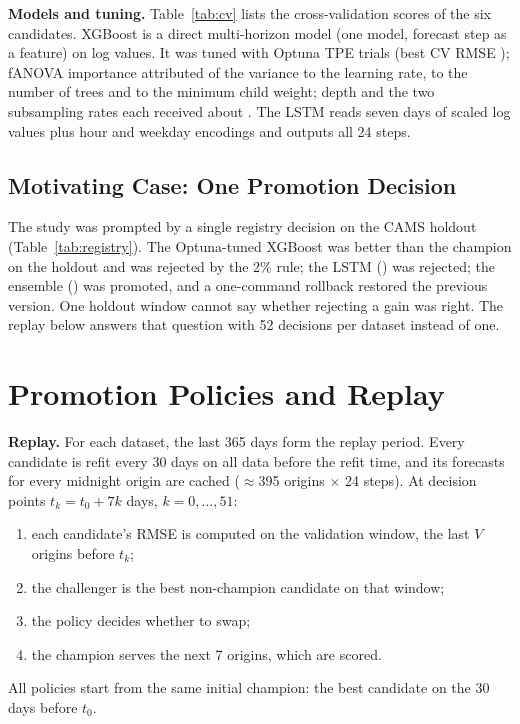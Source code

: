 \documentclass[conference]{IEEEtran}
\begin{document}
\textbf{Models and tuning.} Table~\ref{tab:cv} lists the cross-validation scores of the six
candidates. XGBoost is a direct multi-horizon model (one model, forecast step as a feature) on
log values. It was tuned with  Optuna TPE trials (best CV RMSE );
fANOVA importance attributed  of the variance to the learning rate,
 to the number of trees and  to the
minimum child weight; depth and the two subsampling rates each received about
. The LSTM
reads seven days of scaled log values plus hour and weekday encodings and outputs all 24 steps.



\subsection{Motivating Case: One Promotion Decision}

The study was prompted by a single registry decision on the CAMS holdout
(Table~\ref{tab:registry}). The Optuna-tuned XGBoost was  better than the champion
on the holdout and was rejected by the 2\% rule; the LSTM () was rejected; the
ensemble () was promoted, and a one-command rollback restored the previous version.
One holdout window cannot say whether rejecting a  gain was right. The replay below
answers that question with 52 decisions per dataset instead of one.


\fi

\section{Promotion Policies and Replay}

\textbf{Replay.} For each dataset, the last 365 days form the replay period. Every candidate is
refit every 30 days on all data before the refit time, and its forecasts for every midnight origin
are cached (\(\approx\)395 origins \(\times\) 24 steps). At decision points \(t_k = t_0 + 7k\) days,
\(k=0,\dots,51\):
\begin{enumerate}
  \item each candidate's RMSE is computed on the validation window, the last \(V\) origins before \(t_k\);
  \item the challenger is the best non-champion candidate on that window;
  \item the policy decides whether to swap;
  \item the champion serves the next 7 origins, which are scored.
\end{enumerate}
All policies start from the same initial champion: the best candidate on the 30 days before \(t_0\).
\end{document}

